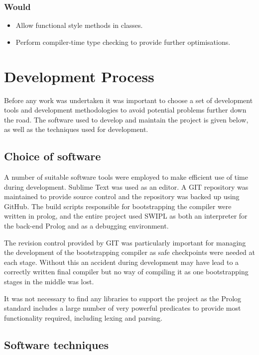 \documentclass[12pt,a4paper,twoside,openright]{report}
\begin{document}
\subsubsection{Would}
\begin{itemize}
	\item Allow functional style methods in classes.
	\item Perform compiler-time type checking to provide further optimisations.
\end{itemize}

\section{Development Process}

Before any work was undertaken it was important to choose a set of development tools and development methodologies to avoid potential problems further down the road. The software used to develop and maintain the project is given below, as well as the techniques used for development.

\subsection{Choice of software}

A number of suitable software tools were employed to make efficient use of time during development. Sublime Text was used as an editor. A GIT repository was maintained to provide source control and the repository was backed up using GitHub. The build scripts responsible for bootstrapping the compiler were written in prolog, and the entire project used SWIPL as both an interpreter for the back-end Prolog and as a debugging environment.

\bigskip

The revision control provided by GIT was particularly important for managing the development of the bootstrapping compiler as safe checkpoints were needed at each stage. Without this an accident during development may have lead to a correctly written final compiler but no way of compiling it as one bootstrapping stages in the middle was lost.

\bigskip

It was not necessary to find any libraries to support the project as the Prolog standard includes a large number of very powerful predicates to provide most functionality required, including lexing and parsing.

\subsection{Software techniques}
\end{document}
